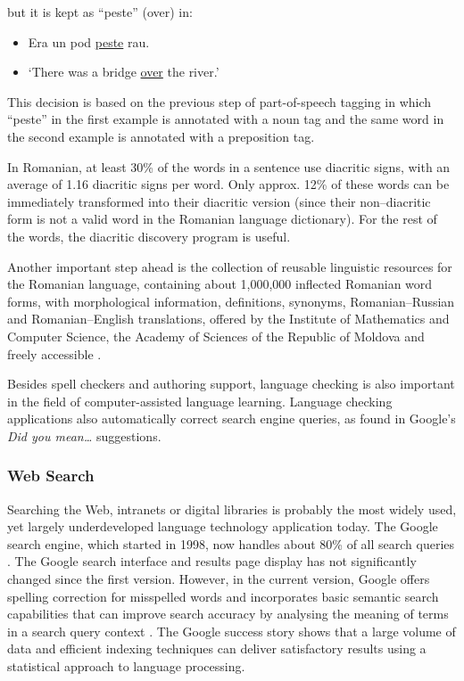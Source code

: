\begin{multicols}{2}
but it is kept as ``peste'' (over) in:

\begin{example}
\begin{itemize}
\item []Era un pod \underline{peste} rau. 
\item []`There was a bridge \underline{over} the river.'
\end{itemize}
\end{example}

This decision is based on the previous step of part-of-speech tagging in which ``peste'' in the first example is annotated with a noun tag and the same word in the second example is annotated with a preposition tag.

In Romanian, at least 30\% of the words in a sentence use diacritic signs, with an average of 1.16 diacritic signs per word. Only approx. 12\% of these words can be immediately transformed into their diacritic version (since their non--diacritic form is not a valid word in the Romanian language dictionary). For the rest of the words, the diacritic discovery program is useful.


Another important step ahead is the collection of reusable linguistic resources for the Romanian language, containing about 1,000,000 inflected Romanian word forms, with morphological information, definitions, synonyms, Romanian--Russian and Romanian--English  translations, offered by the Institute of Mathematics and Computer Science, the Academy of Sciences of the Republic of Moldova and freely accessible \cite{elrr}.

Besides spell checkers and authoring support, language checking is also important in the field of computer-assisted language learning. Language checking applications also automatically correct search engine queries, as found in Google's \textit{Did you mean…} suggestions.

\subsubsection{Web Search}

Searching the Web, intranets or digital libraries is probably the most widely used, yet largely underdeveloped language technology application today. The Google search engine, which started in 1998, now handles about 80\% of all search queries \cite{spi1}. The Google search interface and results page display has not significantly changed since the first version. However, in the current version, Google offers spelling correction for misspelled words and incorporates basic semantic search capabilities that can improve search accuracy by analysing the meaning of terms in a search query context \cite{pc1}. The Google success story shows that a large volume of data and efficient indexing techniques can deliver satisfactory results using a statistical approach to language processing. 


\end{multicols}
